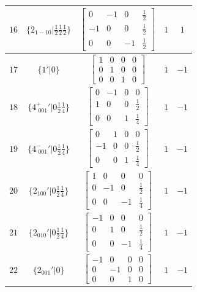 \documentclass[fleqn,8pt]{jsarticle}
\begin{document}
\begin{longtable}{ccccc}
$ 16 $ & $ \{2{}_{1-10}|\frac{1}{2} \frac{1}{2} \frac{1}{2}\} $ & $ \begin{bmatrix} 0 & -1 & 0 & \frac{1}{2} \\ -1 & 0 & 0 & \frac{1}{2} \\ 0 & 0 & -1 & \frac{1}{2} \end{bmatrix} $ & $ 1 $ & $ 1 $ \\ \hline
$ 17 $ & $ \{1{}'|0\} $ & $ \begin{bmatrix} 1 & 0 & 0 & 0 \\ 0 & 1 & 0 & 0 \\ 0 & 0 & 1 & 0 \end{bmatrix} $ & $ 1 $ & $ -1 $ \\ \hline
$ 18 $ & $ \{4^{+}_{\,\,001}{}'|0 \frac{1}{2} \frac{1}{4}\} $ & $ \begin{bmatrix} 0 & -1 & 0 & 0 \\ 1 & 0 & 0 & \frac{1}{2} \\ 0 & 0 & 1 & \frac{1}{4} \end{bmatrix} $ & $ 1 $ & $ -1 $ \\ \hline
$ 19 $ & $ \{4^{-}_{\,\,001}{}'|0 \frac{1}{2} \frac{1}{4}\} $ & $ \begin{bmatrix} 0 & 1 & 0 & 0 \\ -1 & 0 & 0 & \frac{1}{2} \\ 0 & 0 & 1 & \frac{1}{4} \end{bmatrix} $ & $ 1 $ & $ -1 $ \\ \hline
$ 20 $ & $ \{2{}_{100}{}'|0 \frac{1}{2} \frac{1}{4}\} $ & $ \begin{bmatrix} 1 & 0 & 0 & 0 \\ 0 & -1 & 0 & \frac{1}{2} \\ 0 & 0 & -1 & \frac{1}{4} \end{bmatrix} $ & $ 1 $ & $ -1 $ \\ \hline
$ 21 $ & $ \{2{}_{010}{}'|0 \frac{1}{2} \frac{1}{4}\} $ & $ \begin{bmatrix} -1 & 0 & 0 & 0 \\ 0 & 1 & 0 & \frac{1}{2} \\ 0 & 0 & -1 & \frac{1}{4} \end{bmatrix} $ & $ 1 $ & $ -1 $ \\ \hline
$ 22 $ & $ \{2{}_{001}{}'|0\} $ & $ \begin{bmatrix} -1 & 0 & 0 & 0 \\ 0 & -1 & 0 & 0 \\ 0 & 0 & 1 & 0 \end{bmatrix} $ & $ 1 $ & $ -1 $ \\ \hline

\end{longtable}
\end{document}
